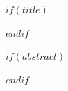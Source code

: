 $if(title)$
\maketitle
$endif$

\linenumbers

$if(abstract)$
\begin{abstract}
$abstract$
\end{abstract}
$endif$